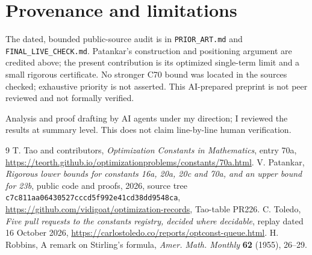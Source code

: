 \documentclass[11pt]{amsart}
\begin{document}
\section*{Provenance and limitations}
The dated, bounded public-source audit is in \texttt{PRIOR\_ART.md} and
\texttt{FINAL\_LIVE\_CHECK.md}. Patankar's construction and positioning
argument are credited above; the present contribution is its optimized
single-term limit and a small rigorous certificate. No stronger C70 bound
was located in the sources checked; exhaustive priority is not asserted.
This AI-prepared preprint is not peer reviewed and not formally verified.

Analysis and proof drafting by AI agents under my direction; I reviewed
the results at summary level. This does not claim line-by-line human
verification.

\begin{thebibliography}{9}
 T. Tao and contributors, \emph{Optimization Constants in
Mathematics}, entry 70a, \url{https://teorth.github.io/optimizationproblems/constants/70a.html}.
 V. Patankar, \emph{Rigorous lower bounds for constants
16a, 20a, 20c and 70a, and an upper bound for 23b}, public code and proofs,
2026, source tree \texttt{c7c811aa06430527cccd5f992e41cd38dd9548ca},
\url{https://github.com/vidigoat/optimization-records}, Tao-table PR226.
 C. Toledo, \emph{Five pull requests to the constants
registry, decided where decidable}, replay dated 16 October 2026,
\url{https://carlostoledo.co/reports/optconst-queue.html}.
 H. Robbins, A remark on Stirling's formula,
\emph{Amer. Math. Monthly} \textbf{62} (1955), 26--29.
\end{thebibliography}
\end{document}
